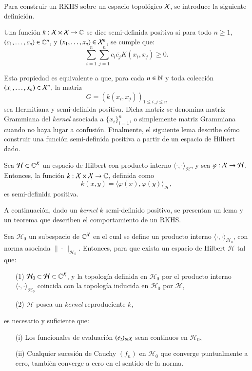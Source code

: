 \noindent Para construir un RKHS sobre un espacio topológico \( \mathcal{X} \), se introduce la siguiente definición.

\begin{defn}  
Una función \( k: \mathcal{X} \times \mathcal{X} \to \mathbb{C} \) se dice semi-definida positiva si para todo \( n \geq 1 \), \( (c_1, \dots, c_n) \in \mathbb{C}^n \), y \( (x_1, \dots, x_n) \in \mathcal{X}^n \), se cumple que:
\[
\sum_{i=1}^n \sum_{j=1}^n c_i \bar{c_j} K(x_i, x_j) \geq 0.
\]
\end{defn}

\noindent Esta propiedad es equivalente a que, para cada \( n \in \mathbb{N} \) y toda colección \( (x_1, \dots, x_n) \in \mathcal{X}^n \), la matriz  
\[
G = \left( k(x_i, x_j) \right)_{1 \leq i, j \leq n}
\]
sea Hermitiana y semi-definida positiva. Dicha matriz se denomina matriz Grammiana del \textit{kernel} asociada a \( \{ x_i \}_{i=1}^n \), o simplemente matriz Grammiana cuando no haya lugar a confusión. Finalmente, el siguiente lema describe cómo construir una función semi-definida positiva a partir de un espacio de Hilbert dado.

\begin{lema}
Sea \( \mathcal{H} \subset \mathbb{C}^{\mathcal{X}} \) un espacio de Hilbert con producto interno \( \langle \cdot, \cdot \rangle_\mathcal{H} \), y sea \( \varphi : \mathcal{X} \to \mathcal{H} \). Entonces, la función \( k: \mathcal{X} \times \mathcal{X} \to \mathbb{C} \), definida como
\[
k(x,y) = \langle \varphi(x), \varphi(y) \rangle_\mathcal{H},
\]
es semi-definida positiva.
\end{lema}

\noindent A continuación, dado un \textit{kernel} \( k \) semi-definido positivo, se presentan un lema y un teorema que describen el comportamiento de un RKHS.

\begin{lema}
Sea \( \mathcal{H}_0 \) un subespacio de \( \mathbb{C}^{\mathcal{X}} \) en el cual se define un producto interno \( \langle \cdot, \cdot \rangle_{\mathcal{H}_0} \), con norma asociada \( \|\cdot\|_{\mathcal{H}_0} \). Entonces, para que exista un espacio de Hilbert \( \mathcal{H} \) tal que:
\begin{enumerate}
    \item[(1)] \( \mathcal{H}_0 \subset \mathcal{H} \subset \mathbb{C}^{\mathcal{X}} \), y la topología definida en \( \mathcal{H}_0 \) por el producto interno \( \langle \cdot, \cdot \rangle_{\mathcal{H}_0} \) coincida con la topología inducida en \( \mathcal{H}_0 \) por \( \mathcal{H} \),
    \item[(2)] \( \mathcal{H} \) posea un \textit{kernel} reproduciente \( k \),
\end{enumerate}
es necesario y suficiente que:
\begin{enumerate}
    \item[(i)] Los funcionales de evaluación \( (e_t)_{t \in \mathcal{X}} \) sean continuos en \( \mathcal{H}_0 \),
    \item[(ii)] Cualquier sucesión de Cauchy \( (f_n) \) en \( \mathcal{H}_0 \) que converge puntualmente a cero, también converge a cero en el sentido de la norma.
\end{enumerate}
\end{lema}

